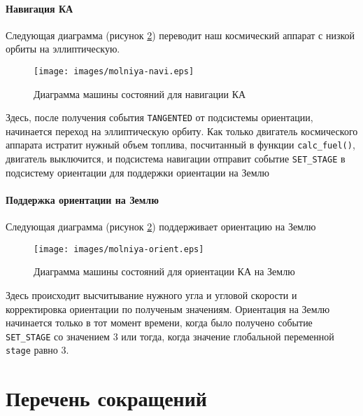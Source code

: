 \documentclass[12pt,a4paper]{article}
\begin{document}
\paragraph{Навигация КА} Следующая диаграмма (рисунок \ref{Pic:Molniya-navi}) переводит наш космический аппарат с низкой орбиты на эллиптическую.

\begin{figure}[tbh]
  \begin{center}
    \texttt{[image: images/molniya-navi.eps]}
    \caption{Диаграмма машины состояний для навигации КА}
    \label{Pic:Molniya-navi}
  \end{center}
\end{figure}

Здесь, после получения события \verb'TANGENTED' от подсистемы ориентации, начинается переход на эллиптическую орбиту. Как только двигатель космического аппарата истратит нужный объем топлива, посчитанный в функции \verb'calc_fuel()', двигатель выключится, и подсистема навигации отправит событие \verb'SET_STAGE' в подсистему ориентации для поддержки ориентации на Землю

\clearpage
\paragraph{Поддержка ориентации на Землю} Следующая диаграмма (рисунок \ref{Pic:Molniya-navi}) поддерживает ориентацию на Землю

\begin{figure}[tbh]
  \begin{center}
    \texttt{[image: images/molniya-orient.eps]}
    \caption{Диаграмма машины состояний для ориентации КА на Землю}
    \label{Pic:Molniya-navi}
  \end{center}
\end{figure}

Здесь происходит высчитывание нужного угла и угловой скорости и корректировка ориентации по полученым значениям.
Ориентация на Землю начинается только в тот момент времени, когда было получено событие \verb'SET_STAGE' со значением 3 или тогда, когда значение глобальной переменной \verb'stage' равно 3.
   
\section*{Перечень сокращений}
\end{document}
